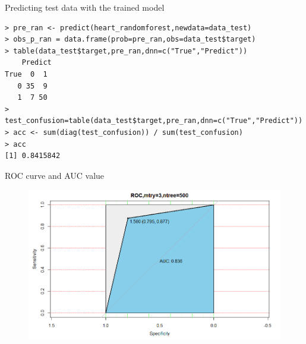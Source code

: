 \documentclass{article}
\begin{document}
Predicting test data with the trained model
\begin{lstlisting}
> pre_ran <- predict(heart_randomforest,newdata=data_test)
> obs_p_ran = data.frame(prob=pre_ran,obs=data_test$target)
> table(data_test$target,pre_ran,dnn=c("True","Predict"))
    Predict
True  0  1
   0 35  9
   1  7 50
> test_confusion=table(data_test$target,pre_ran,dnn=c("True","Predict"))
> acc <- sum(diag(test_confusion)) / sum(test_confusion)
> acc
[1] 0.8415842
\end{lstlisting}
ROC curve and AUC value
 \begin{figure}[H]
\centering
  \includegraphics[width=1\textwidth]{1-3-2.png} %
\end{figure}
\end{document}
